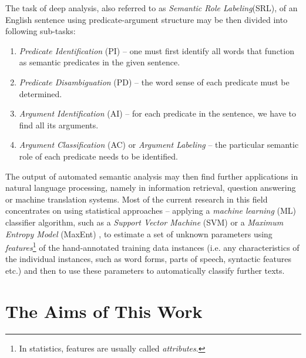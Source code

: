 \documentclass[12pt,notitlepage]{report}
\begin{document}
The task of deep analysis, also referred to as \emph{Semantic Role Labeling}(SRL), of an English sentence using predicate-argument structure may be then divided into following sub-tasks:
\begin{enumerate}
    \item \emph{Predicate Identification} (PI) -- one must first identify all words that function as semantic predicates in the given sentence.
    \item \emph{Predicate Disambiguation} (PD) -- the word sense of each predicate must be determined.
    \item \emph{Argument Identification}  (AI) -- for each predicate in the sentence, we have to find all its arguments.
    \item \emph{Argument Classification} (AC) or \emph{Argument Labeling} -- the particular semantic role of each predicate needs to be identified.
\end{enumerate}

The output of automated semantic analysis may then find further applications in natural language processing, namely in information retrieval, question answering or machine translation systems. Most of the current research in this field concentrates on using statistical approaches -- applying a \emph{machine learning} (ML) classifier algorithm, such as a \emph{Support Vector Machine} (SVM) \citep{boser92} or a \emph{Maximum Entropy Model} (MaxEnt) \citep{jelinek97}, to estimate a set of unknown parameters using \emph{features}\footnote{In statistics, features are usually called \emph{attributes}.} of the hand-annotated training data instances (i.e. any characteristics of the individual instances, such as word forms, parts of speech, syntactic features etc.) and then to use these parameters to automatically classify further texts.

\section{The Aims of This Work}\label{aims}
\end{document}
